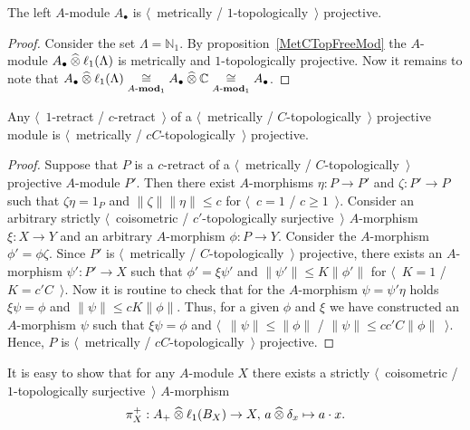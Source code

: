 \begin{proposition}\label{UnitalAlgIsMetTopProj} The left $A$-module $A_\bullet$
is $\langle$~metrically / $1$-topologically~$\rangle$ projective.
\end{proposition} 
\begin{proof} Consider the set $\Lambda=\mathbb{N}_1$. 
By proposition~\ref{MetCTopFreeMod} the 
$A$-module $A_\bullet\mathbin{\widehat{\otimes}}\ell_1(\Lambda)$ is metrically 
and $1$-topologically projective. Now it remains to note that 
$A_\bullet\mathbin{\widehat{\otimes}}\ell_1(\Lambda)
\mathrel{\mathop{\cong}\limits_{A\text{-}\mathbf{mod}_1}}
A_\bullet\mathbin{\widehat{\otimes}} \mathbb{C}
\mathrel{\mathop{\cong}\limits_{A\text{-}\mathbf{mod}_1}}
A_\bullet$.
\end{proof}

\begin{proposition}\label{RetrMetCTopProjIsMetCTopProj} Any 
$\langle$~$1$-retract / $c$-retract~$\rangle$ of a 
$\langle$~metrically / $C$-topologically~$\rangle$ projective module is
$\langle$~metrically / $c C$-topologically~$\rangle$ projective.
\end{proposition}
\begin{proof} Suppose that $P$ is a $c$-retract of a 
$\langle$~metrically / $C$-topologically~$\rangle$ projective $A$-module $P'$.
Then there exist $A$-morphisms $\eta:P\to P'$ and $\zeta: P'\to P$ such that
$\zeta\eta=1_{P}$ and $\lVert\zeta\rVert\lVert\eta\rVert\leq c$ 
for $\langle$~$c=1$ / $c\geq 1$~$\rangle$. Consider an arbitrary
strictly $\langle$~coisometric / $c'$-topologically surjective~$\rangle$ 
$A$-morphism $\xi:X\to Y$ and an arbitrary $A$-morphism $\phi:P\to Y$. 
Consider the $A$-morphism $\phi'=\phi\zeta$. Since $P'$ is 
$\langle$~metrically / $C$-topologically~$\rangle$ projective, there 
exists an $A$-morphism $\psi':P'\to X$ such that $\phi'=\xi\psi'$ 
and $\lVert\psi'\rVert \leq K\lVert\phi'\rVert$ 
for $\langle$~$K=1$ / $K=c' C$~$\rangle$. Now it is routine to check that 
for the $A$-morphism $\psi=\psi'\eta$ 
holds $\xi\psi=\phi$ and $\lVert\psi\rVert \leq cK\lVert\phi\rVert$. 
Thus, for a given $\phi$ and $\xi$ we have
constructed an $A$-morphism $\psi$ such that $\xi\psi=\phi$  and
$\langle$~$\lVert\psi\rVert\leq\lVert\phi\rVert$ / 
$\lVert \psi\rVert\leq c c' C\lVert\phi\rVert$~$\rangle$. Hence, $P$ 
is $\langle$~metrically / $c C$-topologically~$\rangle$ projective.
\end{proof}

It is easy to show that for any $A$-module $X$ there exists 
a strictly $\langle$~coisometric / $1$-topologically surjective~$\rangle$ 
$A$-morphism
\[
\pi_X^+:A_+\mathbin{\widehat{\otimes}} \ell_1(B_X)\to X,\, a\mathbin{\widehat{\otimes}} \delta_x\mapsto a\cdot x.
\]

